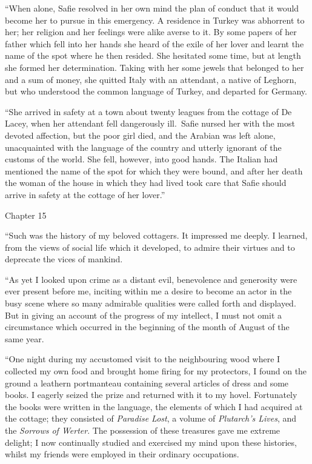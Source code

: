 \documentclass[12pt,openright]{book}
\begin{document}
“When alone, Safie resolved in her own mind the plan of conduct that it would become her to pursue in this emergency. A residence in Turkey was abhorrent to her; her religion and her feelings were alike averse to it. By some papers of her father which fell into her hands she heard of the exile of her lover and learnt the name of the spot where he then resided. She hesitated some time, but at length she formed her determination. Taking with her some jewels that belonged to her and a sum of money, she quitted Italy with an attendant, a native of Leghorn, but who understood the common language of Turkey, and departed for Germany.

“She arrived in safety at a town about twenty leagues from the cottage of De Lacey, when her attendant fell dangerously ill. Safie nursed her with the most devoted affection, but the poor girl died, and the Arabian was left alone, unacquainted with the language of the country and utterly ignorant of the customs of the world. She fell, however, into good hands. The Italian had mentioned the name of the spot for which they were bound, and after her death the woman of the house in which they had lived took care that Safie should arrive in safety at the cottage of her lover.”

Chapter 15

“Such was the history of my beloved cottagers. It impressed me deeply. I learned, from the views of social life which it developed, to admire their virtues and to deprecate the vices of mankind.

“As yet I looked upon crime as a distant evil, benevolence and generosity were ever present before me, inciting within me a desire to become an actor in the busy scene where so many admirable qualities were called forth and displayed. But in giving an account of the progress of my intellect, I must not omit a circumstance which occurred in the beginning of the month of August of the same year.

“One night during my accustomed visit to the neighbouring wood where I collected my own food and brought home firing for my protectors, I found on the ground a leathern portmanteau containing several articles of dress and some books. I eagerly seized the prize and returned with it to my hovel. Fortunately the books were written in the language, the elements of which I had acquired at the cottage; they consisted of \textit{Paradise Lost}, a volume of \textit{Plutarch’s Lives}, and the \textit{Sorrows of Werter}. The possession of these treasures gave me extreme delight; I now continually studied and exercised my mind upon these histories, whilst my friends were employed in their ordinary occupations.
\end{document}
